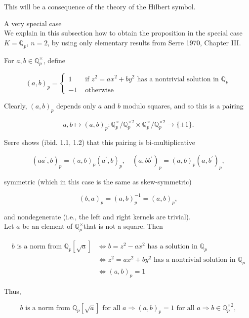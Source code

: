 \documentclass[10pt]{article}
\begin{document}
This will be a consequence of the theory of the Hilbert symbol.

A very special case\\
We explain in this subsection how to obtain the proposition in the special case $K=\mathbb{Q}_{p}$, $n=2$, by using only elementary results from Serre 1970, Chapter III.

For $a, b \in \mathbb{Q}_{p}^{\times}$, define

$$
(a, b)_{p}=\left\{\begin{aligned}
1 & \text { if } z^{2}=a x^{2}+b y^{2} \text { has a nontrivial solution in } \mathbb{Q}_{p} \\
-1 & \text { otherwise }
\end{aligned}\right.
$$

Clearly, $(a, b)_{p}$ depends only $a$ and $b$ modulo squares, and so this is a pairing

$$
a, b \mapsto(a, b)_{p}: \mathbb{Q}_{p}^{\times} / \mathbb{Q}_{p}^{\times 2} \times \mathbb{Q}_{p}^{\times} / \mathbb{Q}_{p}^{\times 2} \rightarrow\{ \pm 1\} .
$$

Serre shows (ibid. 1.1, 1.2) that this pairing is bi-multiplicative

$$
\left(a a^{\prime}, b\right)_{p}=(a, b)_{p}\left(a^{\prime}, b\right)_{p}, \quad\left(a, b b^{\prime}\right)_{p}=(a, b)_{p}\left(a, b^{\prime}\right)_{p},
$$

symmetric (which in this case is the same as skew-symmetric)

$$
(b, a)_{p}=(a, b)_{p}^{-1}=(a, b)_{p},
$$

and nondegenerate (i.e., the left and right kernels are trivial).\\
Let $a$ be an element of $\mathbb{Q}_{p}^{\times}$that is not a square. Then

$$
\begin{aligned}
b \text { is a norm from } \mathbb{Q}_{p}[\sqrt{a}] & \Longleftrightarrow b=z^{2}-a x^{2} \text { has a solution in } \mathbb{Q}_{p} \\
& \Longleftrightarrow z^{2}=a x^{2}+b y^{2} \text { has a nontrivial solution in } \mathbb{Q}_{p} \\
& \Longleftrightarrow(a, b)_{p}=1
\end{aligned}
$$

Thus,

$$
b \text { is a norm from } \mathbb{Q}_{p}[\sqrt{a}] \text { for all } a \Longrightarrow(a, b)_{p}=1 \text { for all } a \Longrightarrow b \in \mathbb{Q}_{p}^{\times 2},
$$
\end{document}
